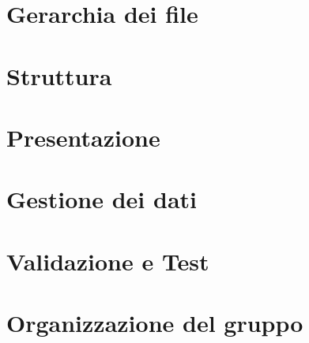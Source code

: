 \documentclass{tecweb}
\begin{document}
	\section{Gerarchia dei file}
	\newpage
	\section{Struttura}
	\newpage
	\section{Presentazione}
	\newpage
	\section{Gestione dei dati}
	\newpage
	\section{Validazione e Test}
	\newpage
	\appendix
	\section{Organizzazione del gruppo}
	
\end{document}
